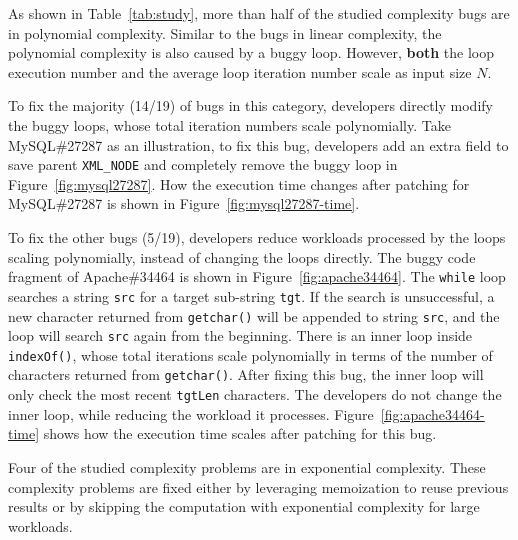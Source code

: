 As shown in Table~\ref{tab:study}, 
more than half of the studied complexity bugs are in polynomial complexity. 
Similar to the bugs in linear complexity,
the polynomial complexity is also caused by a buggy loop.
However, {\bf both} the loop execution number 
and the average loop iteration number
scale as input size $N$.






To fix the majority (14/19) of bugs in this category,
developers directly modify the buggy loops, 
whose total iteration numbers scale polynomially.
Take MySQL\#27287 as an illustration,
to fix this bug,
developers add an extra field to save parent \texttt{XML\_NODE}
and completely remove the buggy loop in Figure~\ref{fig:mysql27287}.
How the execution time changes after patching for MySQL\#27287 is 
shown in Figure~\ref{fig:mysql27287-time}. 


To fix the other bugs (5/19),
developers reduce workloads processed by the loops scaling polynomially, 
instead of changing the loops directly.
The buggy code fragment of Apache\#34464 is shown in Figure~\ref{fig:apache34464}.
The 
\texttt{while} loop searches a string \texttt{src}
for a target sub-string \texttt{tgt}.
If the search is unsuccessful, 
a new character returned from \texttt{getchar()} will be appended 
to string \texttt{src}, 
and the loop will search \texttt{src} again from the beginning. 
There is an inner loop inside \texttt{indexOf()}, whose total iterations 
scale polynomially in terms of the number of characters returned from \texttt{getchar()}. 
After fixing this bug, the inner loop will only check the most recent \texttt{tgtLen} characters.
The developers do not change the inner loop, 
while reducing the workload it processes.   
Figure~\ref{fig:apache34464-time} shows 
how the execution time scales after patching for 
this bug.



Four of the studied complexity problems are in exponential complexity. 
These complexity problems are fixed 
either by leveraging memoization to reuse previous results 
or by skipping the computation with exponential complexity for large workloads. 



